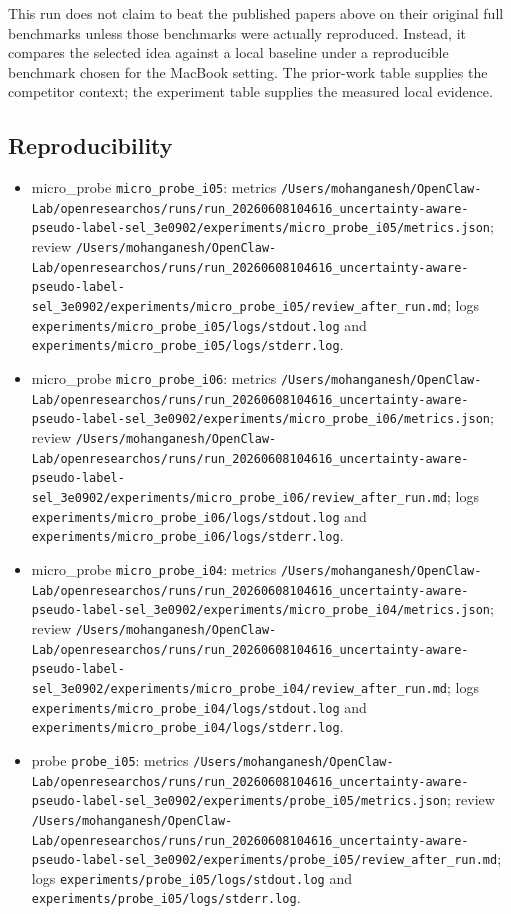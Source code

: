 \documentclass[
  11pt,
]{article}
\providecommand{\tightlist}{%
  \setlength{\itemsep}{0pt}\setlength{\parskip}{0pt}}
\begin{document}
This run does not claim to beat the published papers above on their original full benchmarks unless those benchmarks were actually reproduced. Instead, it compares the selected idea against a local baseline under a reproducible benchmark chosen for the MacBook setting. The prior-work table supplies the competitor context; the experiment table supplies the measured local evidence.

\subsection{Reproducibility}\label{reproducibility}

\begin{itemize}
\tightlist
\item
  micro\_probe \texttt{micro\_probe\_i05}: metrics \texttt{/Users/mohanganesh/OpenClaw-Lab/openresearchos/runs/run\_20260608104616\_uncertainty-aware-pseudo-label-sel\_3e0902/experiments/micro\_probe\_i05/metrics.json}; review \texttt{/Users/mohanganesh/OpenClaw-Lab/openresearchos/runs/run\_20260608104616\_uncertainty-aware-pseudo-label-sel\_3e0902/experiments/micro\_probe\_i05/review\_after\_run.md}; logs \texttt{experiments/micro\_probe\_i05/logs/stdout.log} and \texttt{experiments/micro\_probe\_i05/logs/stderr.log}.
\item
  micro\_probe \texttt{micro\_probe\_i06}: metrics \texttt{/Users/mohanganesh/OpenClaw-Lab/openresearchos/runs/run\_20260608104616\_uncertainty-aware-pseudo-label-sel\_3e0902/experiments/micro\_probe\_i06/metrics.json}; review \texttt{/Users/mohanganesh/OpenClaw-Lab/openresearchos/runs/run\_20260608104616\_uncertainty-aware-pseudo-label-sel\_3e0902/experiments/micro\_probe\_i06/review\_after\_run.md}; logs \texttt{experiments/micro\_probe\_i06/logs/stdout.log} and \texttt{experiments/micro\_probe\_i06/logs/stderr.log}.
\item
  micro\_probe \texttt{micro\_probe\_i04}: metrics \texttt{/Users/mohanganesh/OpenClaw-Lab/openresearchos/runs/run\_20260608104616\_uncertainty-aware-pseudo-label-sel\_3e0902/experiments/micro\_probe\_i04/metrics.json}; review \texttt{/Users/mohanganesh/OpenClaw-Lab/openresearchos/runs/run\_20260608104616\_uncertainty-aware-pseudo-label-sel\_3e0902/experiments/micro\_probe\_i04/review\_after\_run.md}; logs \texttt{experiments/micro\_probe\_i04/logs/stdout.log} and \texttt{experiments/micro\_probe\_i04/logs/stderr.log}.
\item
  probe \texttt{probe\_i05}: metrics \texttt{/Users/mohanganesh/OpenClaw-Lab/openresearchos/runs/run\_20260608104616\_uncertainty-aware-pseudo-label-sel\_3e0902/experiments/probe\_i05/metrics.json}; review \texttt{/Users/mohanganesh/OpenClaw-Lab/openresearchos/runs/run\_20260608104616\_uncertainty-aware-pseudo-label-sel\_3e0902/experiments/probe\_i05/review\_after\_run.md}; logs \texttt{experiments/probe\_i05/logs/stdout.log} and \texttt{experiments/probe\_i05/logs/stderr.log}.

\end{itemize}
\end{document}
